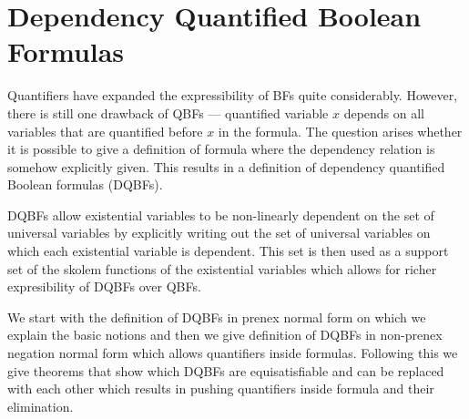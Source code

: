 \documentclass[
  digital, %
  twoside, %
  table,   %
  nolof,     %
  nolot,     %
]{fithesis3}
\let\setbuilder\set
\newcommand{\simpleset}[1]{\{{#1}\}}
\renewcommand{\set}[1]{\normalexpandarg\IfSubStr{#1}{|}{\setbuilder{#1}}{\simpleset{#1}}}
\theoremstyle{definition}
\theoremstyle{remark}
\newcommand{\BF}[1]{BF(#1)}
\begin{document}


\section{Dependency Quantified Boolean Formulas}
Quantifiers have expanded the expressibility of BFs quite considerably. However, there is still one drawback of QBFs --- quantified variable $x$ depends on all variables that are quantified before $x$ in the formula. The question arises whether it is possible to give a definition of formula where the dependency relation is somehow explicitly given. This results in a definition of dependency quantified Boolean formulas (DQBFs).

DQBFs allow existential variables to be non-linearly dependent on the set of universal variables by explicitly writing out the set of universal variables on which each existential variable is dependent. This set is then used as a support set of the skolem functions of the existential variables which allows for richer expresibility of DQBFs over QBFs.  

We start with the definition of DQBFs in prenex normal form on which we explain the basic notions and then we give definition of DQBFs in non-prenex negation normal form which allows quantifiers inside formulas. Following this we give theorems that show which DQBFs are equisatisfiable and can be replaced with each other which results in pushing quantifiers inside formula and their elimination.
\end{document}
